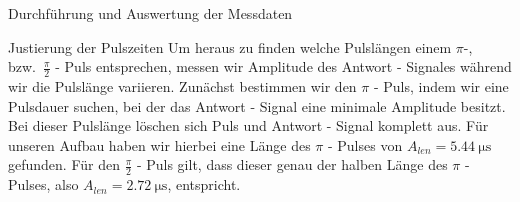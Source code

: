 \documentclass[pdftex, a4paper,11pt, twoside, ngerman]{report}
\begin{document}
\begin{chapter}{Durchführung und Auswertung der Messdaten}
    \begin{section}{Justierung der Pulszeiten}
      \label{chpPulszeiten}
      Um heraus zu finden welche Pulslängen einem $\pi$-, bzw.\
      $\frac{\pi}{2}$ - Puls entsprechen, messen wir Amplitude des
      Antwort - Signales während wir die Pulslänge variieren.
      Zunächst bestimmen wir den $\pi$ - Puls, indem wir eine Pulsdauer suchen,
      bei der das Antwort - Signal eine minimale Amplitude besitzt.
      Bei dieser Pulslänge löschen sich Puls und Antwort - Signal komplett aus.
      \todo{Warum?}
      Für unseren Aufbau haben wir hierbei eine Länge des $\pi$ - Pulses von
      $A_{len}=\SI{5.44}{\micro\second}$ gefunden.
      Für den $\frac{\pi}{2}$ - Puls gilt, dass dieser genau der halben Länge
      des $\pi$ - Pulses, also $A_{len}=\SI{2.72}{\micro\second}$, entspricht.
      
      
    \end{section}
    
    
    

\end{chapter}
\end{document}
